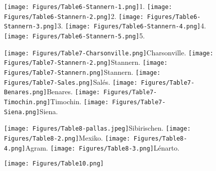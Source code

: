 \documentclass[a4paper, 11pt, oneside, german]{article}
\begin{document}
\clearpage
{}
\cfoot{\thepage}
\begin{figure}[p]
\texttt{[image: Figures/Table6-Stannern-1.png]}\tiny 1.
\texttt{[image: Figures/Table6-Stannern-2.png]}\tiny 2.
\texttt{[image: Figures/Table6-Stannern-3.png]}\tiny 3.
\texttt{[image: Figures/Table6-Stannern-4.png]}\tiny 4.
\texttt{[image: Figures/Table6-Stannern-5.png]}\tiny 5.
\end{figure}
\clearpage
{}
\cfoot{\thepage}
\begin{figure}[p]
\texttt{[image: Figures/Table7-Charsonville.png]}\tiny Charsonville.
\texttt{[image: Figures/Table7-Stannern-2.png]}\tiny Stannern.
\texttt{[image: Figures/Table7-Stannern.png]}\tiny Stannern.
\texttt{[image: Figures/Table7-Sales.png]}\tiny Salés.
\texttt{[image: Figures/Table7-Benares.png]}\tiny Benares.
\texttt{[image: Figures/Table7-Timochin.png]}\tiny Timochin.
\texttt{[image: Figures/Table7-Siena.png]}\tiny Siena.
\end{figure}
\clearpage
{}
\cfoot{\thepage}
\begin{figure}[p]
\texttt{[image: Figures/Table8-pallas.jpeg]}\tiny Sibirischen.
\texttt{[image: Figures/Table8-2.png]}\tiny Mexiko.
\texttt{[image: Figures/Table8-4.png]}\tiny Agram.
\texttt{[image: Figures/Table8-3.png]}\tiny Lénarto.
\end{figure}
\clearpage
{}
\cfoot{\thepage}
\begin{figure}[p]
\texttt{[image: Figures/Table10.png]}
\end{figure}
\clearpage
\end{document}
